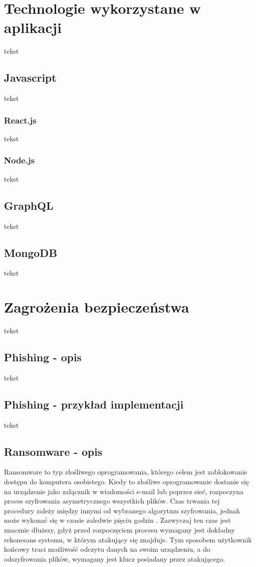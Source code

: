 \documentclass[12pt,twoside]{article}
\begin{document}
\clearpage

\section{Technologie wykorzystane w aplikacji}
tekst 
\subsection{Javascript}
tekst 
\subsubsection{React.js}
tekst 
\subsubsection{Node.js}
tekst 
\subsection{GraphQL}
tekst 
\subsection{MongoDB}
tekst 

\clearpage
\section{Zagrożenia bezpieczeństwa}
tekst
\subsection{Phishing - opis}
tekst
\subsection{Phishing - przykład implementacji}
tekst 
\clearpage
\subsection{Ransomware - opis}
Ransomware to typ złośliwego oprogramowania, którego celem jest zablokowanie dostępu do komputera osobistego. Kiedy to złośliwe oprogramowanie dostanie się na urządzenie jako załącznik w wiadomości e-mail lub poprzez sieć, rozpoczyna proces szyfrowania asymetrycznego wszystkich plików. Czas trwania tej procedury zależy między innymi od wybranego algorytmu szyfrowania, jednak może wykonać się w czasie zaledwie pięciu godzin \cite{RansomwareTime}. Zazwyczaj ten czas jest znacznie dłuższy, gdyż przed rozpoczęciem procesu wymagany jest dokładny rekonesans systemu, w którym atakujący się znajduje. Tym sposobem użytkownik końcowy traci możliwość odczytu danych na swoim urządzeniu, a do odszyfrowania plików, wymagany jest klucz posiadany przez atakującego. 
\end{document}
